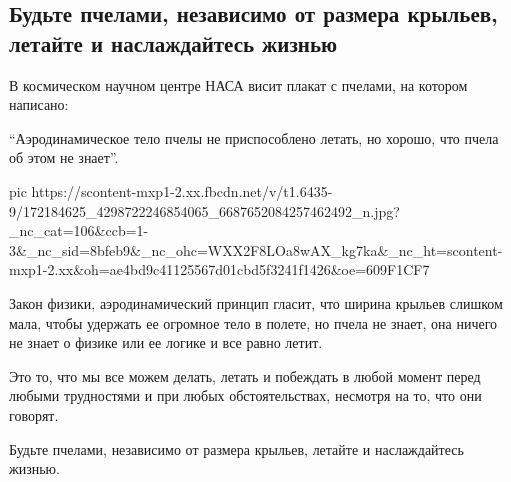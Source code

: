  
 
 
 
 
\subsection{Будьте пчелами, независимо от размера крыльев, летайте и наслаждайтесь жизнью}

В космическом научном центре НАСА висит плакат с пчелами, на котором написано:

\enquote{Аэродинамическое тело пчелы не приспособлено летать, но хорошо, что пчела об этом не знает}.

\ifcmt
  pic https://scontent-mxp1-2.xx.fbcdn.net/v/t1.6435-9/172184625_4298722246854065_6687652084257462492_n.jpg?_nc_cat=106&ccb=1-3&_nc_sid=8bfeb9&_nc_ohc=WXX2F8LOa8wAX_kg7ka&_nc_ht=scontent-mxp1-2.xx&oh=ae4bd9c41125567d01cbd5f3241f1426&oe=609F1CF7
\fi

Закон физики, аэродинамический принцип гласит, что ширина крыльев слишком
мала, чтобы удержать ее огромное тело в полете, но пчела не знает, она ничего
не знает о физике или ее логике и все равно летит.

Это то, что мы все можем делать, летать и побеждать в любой момент перед
любыми трудностями и при любых обстоятельствах, несмотря на то, что они
говорят.

Будьте пчелами, независимо от размера крыльев, летайте и наслаждайтесь жизнью.
